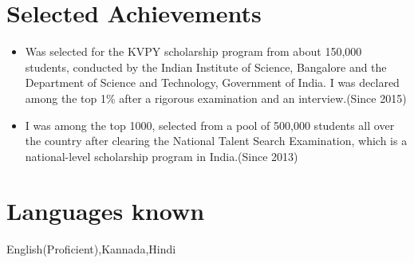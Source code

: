 \documentclass[margin, centered]{res}
\begin{document}
\begin{resume}
\section{\textbf{Selected Achievements}}
\begin{itemize}
\item Was selected for the KVPY scholarship program from about 150,000 students, conducted by the Indian Institute of Science, Bangalore and the Department of Science and Technology, Government of India. I was declared among the top 1\% after a rigorous examination and an interview.(Since 2015)
\item I was among the top 1000, selected from a pool of 500,000 students all over the country after clearing the National Talent Search Examination, which is a national-level scholarship program in India.(Since 2013)
\end{itemize}


\section{\textbf{Languages known}}
English(Proficient),Kannada,Hindi




\end{resume}
\end{document}

